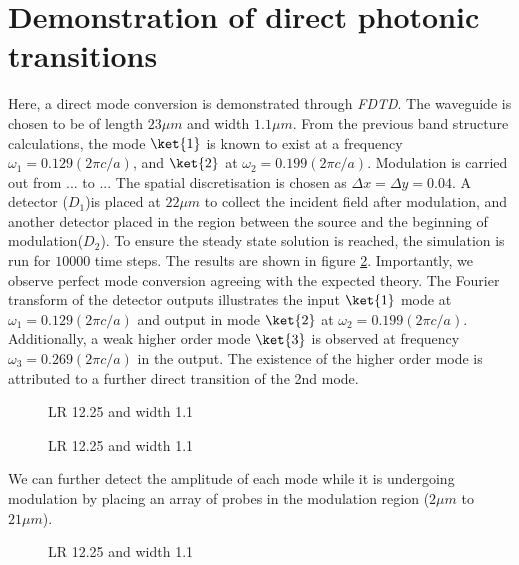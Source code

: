 \section{Demonstration of direct photonic transitions}

Here, a direct mode conversion is demonstrated through \textit{FDTD}. The waveguide is chosen to be of length $23 \mu m$ and width $1.1 \mu m$. From the previous band structure calculations, the mode $\ket{1}$ is known to exist at a frequency $\omega_1 = 0.129 (2 \pi c/a)$, and $\ket{2}$ at $\omega_2 = 0.199 (2 \pi c/a)$. Modulation is carried out from ... to ... The spatial discretisation is chosen as $\Delta x = \Delta y = 0.04$. A detector ($D_1$)is placed at $22 \mu m$ to collect the incident field after modulation, and another detector placed in the region between the source and the beginning of modulation($D_2$). To ensure the steady state solution is reached, the simulation is run for $10 000$ time steps. The results are shown in figure \ref{fig:reciprocalmode}. Importantly, we observe perfect mode conversion agreeing with the expected theory. The Fourier transform of the detector outputs illustrates the input $\ket{1}$ mode at $\omega_1 = 0.129 (2\pi c/a)$ and output in mode $\ket{2}$ at $\omega_2 = 0.199 (2\pi c/a)$. Additionally, a weak higher order mode $\ket{3}$ is observed at frequency $\omega_3 = 0.269 (2\pi c/a)$ in the output. The existence of the higher order mode is attributed to a further direct transition of the 2nd mode. 

\begin{figure}[t]
	\centering
	\setlength{\figH}{0.4\textwidth}
	\setlength{\figW}{0.7\textwidth}
	
	\caption[The modulated waveguide structure]{LR 12.25 and width 1.1}
	\label{fig:reciprocalmode_fourier}
\end{figure} 

\begin{figure}[t]
	\centering
	\setlength{\figH}{0.1\textwidth}
	\setlength{\figW}{0.8\textwidth}
	
	\caption[The modulated waveguide structure]{LR 12.25 and width 1.1}
	\label{fig:reciprocalmode}
\end{figure} 

We can further detect the amplitude of each mode while it is undergoing modulation by placing an array of probes in the modulation region ($2 \mu m$ to $21 \mu m$).

\begin{figure}[t]
	\centering
	\setlength{\figH}{0.3\textwidth}
	\setlength{\figW}{0.8\textwidth}
	
	\caption[The modulated waveguide structure]{LR 12.25 and width 1.1}
	\label{fig:coherencelength}
\end{figure} 



